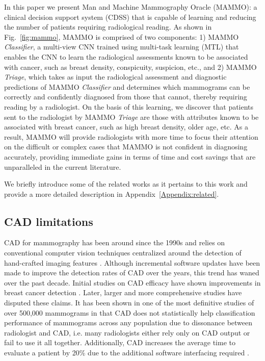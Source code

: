 \documentclass[journal]{IEEEtran}
\begin{document}
In this paper we present Man and Machine Mammography Oracle (MAMMO): a clinical decision support system (CDSS) that is capable of learning and reducing the number of patients requiring radiological reading.  As shown in Fig.~\ref{fig:mammo}, MAMMO is comprised of two components: 1) MAMMO \textit{Classifier}, a multi-view CNN trained using multi-task learning (MTL) that enables the CNN to learn the radiological assessments known to be associated with cancer, such as breast density, conspicuity, suspicion, etc., and 2) MAMMO \textit{Triage}, which takes as input the radiological assessment and diagnostic predictions of MAMMO \textit{Classifier} and determines which mammograms can be correctly and confidently diagnosed from those that cannot, thereby requiring reading by a radiologist.  On the basis of this learning, we discover that patients sent to the radiologist by MAMMO \textit{Triage} are those with attributes known to be associated with breast cancer, such as high breast density, older age, etc.  As a result, MAMMO will provide radiologists with more time to focus their attention on the difficult or complex cases that MAMMO is not confident in diagnosing accurately, providing immediate gains in terms of time and cost savings that are unparalleled in the current literature.

We briefly introduce some of the related works as it pertains to this work and provide a more detailed description in Appendix~\ref{Appendix:related}.

\subsection{CAD limitations}
CAD for mammography has been around since the 1990s and relies on conventional computer vision techniques centralized around the detection of hand-crafted imaging features \cite{jamieson-2012}.  Although incremental software updates have been made to improve the detection rates of CAD over the years, this trend has waned over the past decade.  Initial studies on CAD efficacy have shown improvements in breast cancer detection \cite{dheeba-2014}.  Later, larger and more comprehensive studies have disputed these claims.  It has been shown in one of the most definitive studies of over 500,000 mammograms in \cite{lehman-2015} that CAD does not statistically help classification performance of mammograms across any population due to dissonance between radiologist and CAD, i.e. many radiologists either rely only on CAD output or fail to use it all together.  Additionally, CAD increases the average time to evaluate a patient by 20\% due to the additional software interfacing required \cite{cad-takesmoretime}.  
\end{document}
